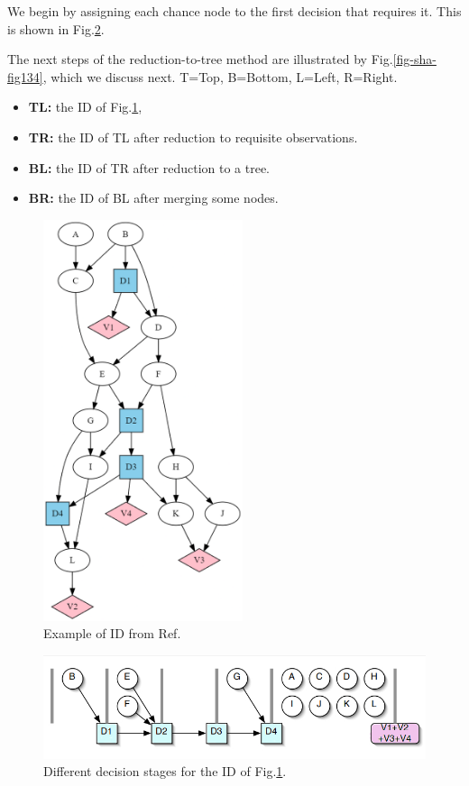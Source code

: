 \begin{itemize}
We begin by assigning each  chance node to
the first decision that requires it. This is shown 
in Fig.\ref{fig-jensen-stages}.


The next steps of the reduction-to-tree
method are illustrated by Fig.\ref{fig-sha-fig134},
which we discuss next.
T=Top, B=Bottom, L=Left, R=Right. 
\begin{itemize}
\item{\bf TL:} the ID of Fig.\ref{fig-sha-fig1},
\item{\bf TR:} the ID of TL after reduction to requisite
observations. 
\item{\bf BL:} the ID of TR after reduction to a tree.
\item {\bf BR:} the ID of BL after merging some nodes.
\end{itemize}


\begin{figure}[h!]
\centering
\includegraphics[width=2.3in]{influ-diag/sha-fig1.png}
\caption{Example of ID from Ref.\cite{sha-influ-diag}}
\label{fig-sha-fig1}
\end{figure}


\begin{figure}[h!]
\centering
\includegraphics[width=6in]
{influ-diag/influ-diag-stages.jpg}
\caption{Different decision stages for the ID of Fig.\ref{fig-sha-fig1}.}
\label{fig-jensen-stages}
\end{figure}


\end{itemize}
